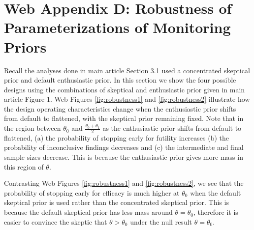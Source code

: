 \documentclass[useAMS,usenatbib,referee]{biom}
\begin{document}
\section*{Web Appendix D: Robustness of Parameterizations of Monitoring Priors}\label{sec:priorRobustness}
Recall the analyses done in main article Section 3.1 used a concentrated skeptical prior and default enthusiastic prior. In this section we show the four possible designs using the combinations of skeptical and enthusiastic prior given in main article Figure 1. Web Figures \ref{fig:robustness1} and \ref{fig:robustness2} illustrate how the design operating characteristics change when the enthusiastic prior shifts from default to flattened, with the skeptical prior remaining fixed. Note that in the region between $\theta_0$ and $\frac{\theta_0+\theta_1}{2}$ as the enthusiastic prior shifts from default to flattened, (a) the probability of stopping early for futility increases (b) the probability of inconclusive findings decreases and (c) the intermediate and final sample sizes decrease. This is because the enthusiastic prior gives more mass in this region of $\theta$. 
%

Contrasting Web Figures \ref{fig:robustness1} and \ref{fig:robustness2}, we see that the probability of stopping early for efficacy is much higher at $\theta_0$ when the default skeptical prior is used rather than the concentrated skeptical prior. This is because the default skeptical prior has less mass around $\theta=\theta_0$, therefore it is easier to convince the skeptic that $\theta>\theta_0$ under the null result $\theta=\theta_0$. %

\end{document}
